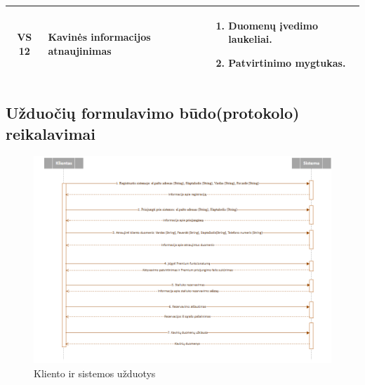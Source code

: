 \documentclass{VUMIFPSkursinis}
\begin{document}
{{{{{\begin{center}
\begin{longtable}{|p{2cm}|p{}|p{}|}
	\hline
		\multicolumn{1}{|c|}{VS 12}& 	
		{Kavinės informacijos atnaujinimas}&
		\multicolumn{1}{|p{8,6cm}|}{
			\begin{enumerate}
				\item Duomenų įvedimo laukeliai.
				\item Patvirtinimo mygtukas.
			\end{enumerate}}\\
	
	\hline
	
	
	\end{longtable}

\end{center}

\pagebreak

\begin{landscape}
\subsection{Užduočių formulavimo būdo(protokolo) reikalavimai}
	\begin {figure}[H]
		\includegraphics[width=1.2\textwidth,height=1.3\textheight,keepaspectratio]{img/b}
		\caption{Kliento ir sistemos užduotys}
		\label{fig:b}
	\end{figure}
\end{landscape}

}}}}}
\end{document}

